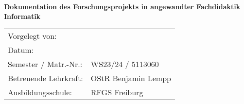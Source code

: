 \makeatletter
\begin{titlepage}
	\Large
	\centering
	\@title
	\vfill
	\Huge
	\textbf{Dokumentation des Forschungsprojekts in angewandter Fachdidaktik Informatik}
	\vfill
	\normalsize
	\begin{tabular*}{\linewidth}{@{\extracolsep{\fill}} ll}
		Vorgelegt von: & \@author \\
		Datum: & \@date \\
		Semester / Matr.-Nr.: & WS23/24 / 5113060 \\
		Betreuende Lehrkraft: & OStR Benjamin Lempp \\
		Ausbildungsschule: & RFGS Freiburg
	\end{tabular*}
\end{titlepage}
\makeatother
\restoregeometry